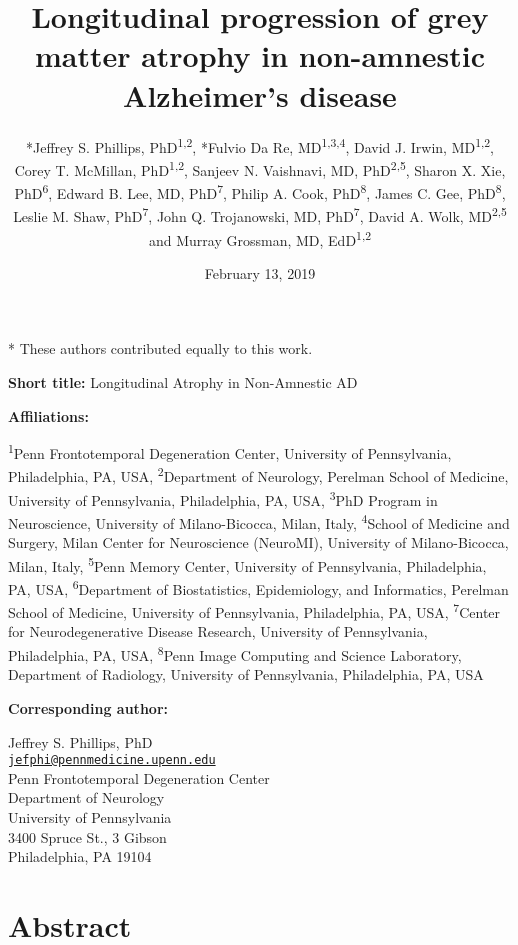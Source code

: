 \documentclass[]{article}
\title{Longitudinal progression of grey matter atrophy in non-amnestic
Alzheimer's disease}
\author{*Jeffrey S. Phillips, PhD\textsuperscript{1,2}, *Fulvio Da Re,
MD\textsuperscript{1,3,4}, David J. Irwin, MD\textsuperscript{1,2},
Corey T. McMillan, PhD\textsuperscript{1,2}, Sanjeev N. Vaishnavi, MD,
PhD\textsuperscript{2,5}, Sharon X. Xie, PhD\textsuperscript{6}, Edward
B. Lee, MD, PhD\textsuperscript{7}, Philip A. Cook,
PhD\textsuperscript{8}, James C. Gee, PhD\textsuperscript{8}, Leslie M.
Shaw, PhD\textsuperscript{7}, John Q. Trojanowski, MD,
PhD\textsuperscript{7}, David A. Wolk, MD\textsuperscript{2,5} and
Murray Grossman, MD, EdD\textsuperscript{1,2}}
\date{February 13, 2019}
\begin{document}
\maketitle


* These authors contributed equally to this work.

\textbf{Short title:} Longitudinal Atrophy in Non-Amnestic AD

\textbf{Affiliations:}

\textsuperscript{1}Penn Frontotemporal Degeneration Center, University
of Pennsylvania, Philadelphia, PA, USA, \textsuperscript{2}Department of
Neurology, Perelman School of Medicine, University of Pennsylvania,
Philadelphia, PA, USA, \textsuperscript{3}PhD Program in Neuroscience,
University of Milano-Bicocca, Milan, Italy, \textsuperscript{4}School of
Medicine and Surgery, Milan Center for Neuroscience (NeuroMI),
University of Milano-Bicocca, Milan, Italy, \textsuperscript{5}Penn
Memory Center, University of Pennsylvania, Philadelphia, PA, USA,
\textsuperscript{6}Department of Biostatistics, Epidemiology, and
Informatics, Perelman School of Medicine, University of Pennsylvania,
Philadelphia, PA, USA, \textsuperscript{7}Center for Neurodegenerative
Disease Research, University of Pennsylvania, Philadelphia, PA, USA,
\textsuperscript{8}Penn Image Computing and Science Laboratory,
Department of Radiology, University of Pennsylvania, Philadelphia, PA,
USA

\textbf{Corresponding author:}

Jeffrey S. Phillips, PhD\\
\href{mailto:jefphi@pennmedicine.upenn.edu}{\nolinkurl{jefphi@pennmedicine.upenn.edu}}\\
Penn Frontotemporal Degeneration Center\\
Department of Neurology\\
University of Pennsylvania\\
3400 Spruce St., 3 Gibson\\
Philadelphia, PA 19104

\newpage


\section*{Abstract}\label{abstract}
\end{document}
